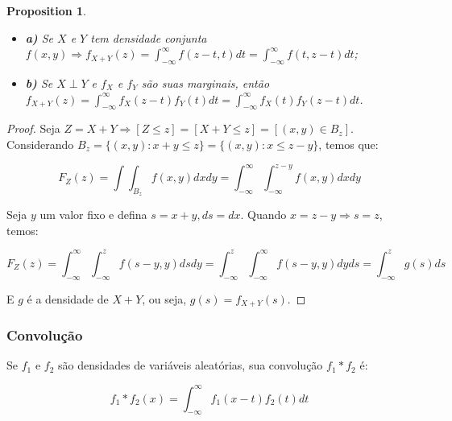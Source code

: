 \documentclass[
]{article}
\providecommand{\tightlist}{%
  \setlength{\itemsep}{0pt}\setlength{\parskip}{0pt}}
\newtheorem{proposition}{Proposition}[section]
\theoremstyle{definition}
\theoremstyle{definition}
\theoremstyle{definition}
\theoremstyle{definition}
\theoremstyle{remark}
\begin{document}
\begin{proposition}
\protect\hypertarget{prp:denssoma}{}\label{prp:denssoma}\leavevmode

\begin{itemize}
\tightlist
\item
  \textbf{a)} Se \(X\) e \(Y\) tem densidade conjunta \(f(x,y) \Rightarrow f_{X+Y}(z) = \int_{-\infty}^{\infty}f(z-t,t)dt = \int_{-\infty}^{\infty}f(t,z-t)dt\);
\item
  \textbf{b)} Se \(X \perp Y\) e \(f_{X}\) e \(f_{Y}\) são suas marginais, então \(f_{X+Y}(z) = \int_{-\infty}^{\infty}f_{X}(z-t)f_{Y}(t)dt = \int_{-\infty}^{\infty}f_{X}(t)f_{Y}(z-t)dt\).
\end{itemize}

\end{proposition}

\begin{proof}
Seja \(Z = X+Y \Rightarrow [Z \le z] = [X+Y \le z] = [(x,y) \in B_{z}]\). Considerando \(B_{z} = \{(x,y):x+y \le z\} = \{(x,y):x \le z-y\}\), temos que:

\begin{equation*}
F_{Z}(z) = \int\int_{B_{z}}f(x,y)dxdy = \int_{-\infty}^{\infty}\int_{-\infty}^{z-y}f(x,y)dxdy
\end{equation*}

Seja \(y\) um valor fixo e defina \(s=x+y, ds = dx\). Quando \(x=z-y \Rightarrow s=z\), temos:

\begin{equation*}
F_{Z}(z) = \int_{-\infty}^{\infty}\int_{-\infty}^{z}f(s-y,y)dsdy = \int_{-\infty}^{z}\int_{-\infty}^{\infty}f(s-y,y)dyds = \int_{-\infty}^{z}g(s)ds
\end{equation*}

E \(g\) é a densidade de \(X+Y\), ou seja, \(g(s) = f_{X+Y}(s)\).
\end{proof}

\hypertarget{convoluuxe7uxe3o}{%
\subsubsection{Convolução}\label{convoluuxe7uxe3o}}

Se \(f_{1}\) e \(f_{2}\) são densidades de variáveis aleatórias, sua convolução \(f_{1}*f_{2}\) é:

\begin{equation*}
f_{1}*f_{2}(x) = \int_{-\infty}^{\infty}f_{1}(x-t)f_{2}(t)dt
\end{equation*}
\end{document}
